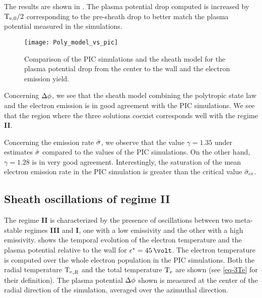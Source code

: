     The results are shown in .
    The plasma potential drop computed is increased by $\mathrm{T_{e, 0}}/2$ corresponding to the pre-sheath drop to better match the plasma potential measured in the simulations.

    \begin{figure}[hbt]
      \centering
      \texttt{[image: Poly\_model\_vs\_pic]}
      \caption{Comparison of the PIC simulations and the sheath model for the plasma potential drop from the center to the wall and the electron emission yield. }
      \label{fig-Poly_model_vs_pic}
    \end{figure}

    Concerning $\Delta \phi$, we see that the sheath model combining the polytropic state law and the electron emission is in good agreement with the \ac{PIC} simulations.
    We see that the region where the three solutions coexist corresponds well with the regime {\bf II}.

    Concerning the emission rate $ \bar{\sigma }$, we observe that the value $\gamma=1.35$ under estimates $ \bar{\sigma }$ compared to the values of the \ac{PIC} simulations.
    On the other hand, $\gamma=1.28$ is in very good agreement.
    Interestingly, the saturation of the mean electron emission rate in the \ac{PIC} simulation is greater than the critical value $ \bar{\sigma }_{\rm cr}$.
    
    
  \subsection{Sheath oscillations of regime {\bf II}} \label{subsec-pic_scheath_RSO}
  
    The regime {\bf II} is characterized by the presence of oscillations between two meta-stable regimes {\bf III} and {\bf I}, one with a low emissivity and the other with a high emissivity.
     shows the temporal evolution of the electron temperature and the plasma potential relative to the wall for $\crover=45\,\volt$.
    The electron temperature is computed over the whole electron population in the \ac{PIC} simulations.
    Both the radial temperature $\mathrm{T_e}_{,R}$ and the total temperature $\mathrm{T_e}$ are shown (see \cref{eq-3Te} for their definition).
    The plasma potential $\Delta \phi$ shown is measured at the center of the radial direction of the simulation, averaged over the azimuthal direction.
    
